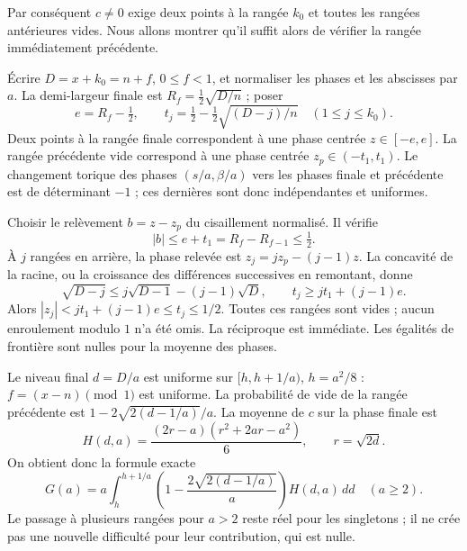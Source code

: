\documentclass[11pt,a4paper]{article}
\begin{document}
Par conséquent $c\ne0$ exige deux points à la rangée $k_0$ et toutes les rangées antérieures vides. Nous allons montrer qu'il suffit alors de vérifier la rangée immédiatement précédente.

Écrire $D=x+k_0=n+f$, $0\le f<1$, et normaliser les phases et les abscisses par $a$. La demi-largeur finale est $R_f=\tfrac12\sqrt{D/n}$ ; poser
\[
 e=R_f-\tfrac12,\qquad
 t_j=\tfrac12-\tfrac12\sqrt{(D-j)/n}\quad(1\le j\le k_0).
\]
Deux points à la rangée finale correspondent à une phase centrée $z\in[-e,e]$. La rangée précédente vide correspond à une phase centrée $z_p\in(-t_1,t_1)$. Le changement torique des phases $(s/a,\beta/a)$ vers les phases finale et précédente est de déterminant $-1$ ; ces dernières sont donc indépendantes et uniformes.

Choisir le relèvement $b=z-z_p$ du cisaillement normalisé. Il vérifie
\[
 |b|\le e+t_1=R_f-R_{f-1}\le\tfrac12.
\]
À $j$ rangées en arrière, la phase relevée est $z_j=jz_p-(j-1)z$. La concavité de la racine, ou la croissance des différences successives en remontant, donne
\[
 \sqrt{D-j}\le j\sqrt{D-1}-(j-1)\sqrt D,
 \qquad t_j\ge jt_1+(j-1)e.
 \tag{11}
\]
Alors $|z_j|<jt_1+(j-1)e\le t_j\le1/2$. Toutes ces rangées sont vides ; aucun enroulement modulo $1$ n'a été omis. La réciproque est immédiate. Les égalités de frontière sont nulles pour la moyenne des phases.

Le niveau final $d=D/a$ est uniforme sur $[h,h+1/a)$, $h=a^2/8$ : $f=(x-n)\pmod1$ est uniforme. La probabilité de vide de la rangée précédente est $1-2\sqrt{2(d-1/a)}/a$. La moyenne de $c$ sur la phase finale est
\[
 H(d,a)=\frac{(2r-a)(r^2+2ar-a^2)}6,\qquad r=\sqrt{2d}.
\]
On obtient donc la formule exacte
\[
 \boxed{G(a)=a\int_h^{h+1/a}
 \left(1-\frac{2\sqrt{2(d-1/a)}}a\right)H(d,a)\,dd\quad(a\ge2).}
 \tag{12}
\]
Le passage à plusieurs rangées pour $a>2$ reste réel pour les singletons ; il ne crée pas une nouvelle difficulté pour leur contribution, qui est nulle.
\end{document}
